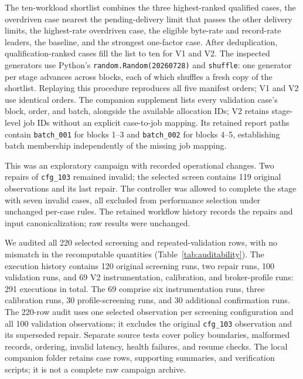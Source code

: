 \documentclass[10pt]{article}
\begin{document}
The ten-workload shortlist combines the three highest-ranked qualified cases,
the overdriven case nearest the pending-delivery limit that passes the other delivery
limits, the highest-rate overdriven case, the eligible byte-rate and
record-rate leaders, the baseline, and the strongest one-factor case.  After
deduplication, qualification-ranked cases fill the list to ten for V1 and V2.
The inspected generators use Python's \texttt{random.Random(20260728)} and
\texttt{shuffle}: one generator per stage advances across blocks, each of which
shuffles a fresh copy of the shortlist. Replaying this procedure reproduces all
five manifest orders;
V1 and V2 use identical orders. The companion supplement lists every validation
case's block, order, and batch, alongside the available allocation IDs; V2 retains
stage-level job IDs without an explicit case-to-job mapping. Its retained
report paths contain \texttt{batch\_001} for blocks 1--3 and \texttt{batch\_002}
for blocks 4--5, establishing batch membership independently of the missing job mapping.

This was an exploratory campaign with recorded operational changes.  Two repairs
of \texttt{cfg\_103} remained invalid; the selected screen contains 119 original
observations and its last repair.  The controller was allowed to complete the
stage with seven invalid cases, all excluded from performance selection under
unchanged per-case rules.  The retained workflow history records the repairs
and input canonicalization; raw results were unchanged.

We audited all 220 selected screening and repeated-validation rows, with no
mismatch in the recomputable quantities (Table~\ref{tab:auditability}).
The execution history contains 120 original screening runs, two repair runs,
100 validation runs, and 69 V2 instrumentation, calibration, and broker-profile
runs: 291 executions in total.  The 69 comprise six instrumentation runs,
three calibration runs, 30 profile-screening runs, and 30 additional confirmation
runs.  The 220-row audit uses one selected observation per screening
configuration and all 100 validation observations; it excludes the original
\texttt{cfg\_103} observation and its superseded repair.
Separate source tests cover policy boundaries, malformed records, ordering,
invalid latency, health failures, and resume checks. The local companion folder
retains case rows, supporting summaries, and verification scripts; it is not a
complete raw campaign archive.
\end{document}
